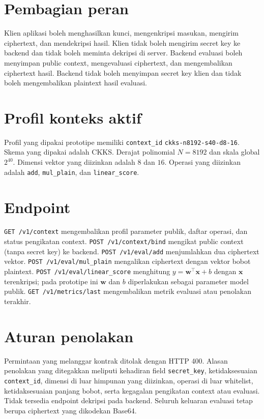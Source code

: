 \documentclass[12pt,a4paper,oneside]{report}
\begin{document}
\section*{Pembagian peran}

Klien aplikasi boleh menghasilkan kunci, mengenkripsi masukan, mengirim ciphertext, dan mendekripsi hasil. Klien tidak boleh mengirim secret key ke backend dan tidak boleh meminta dekripsi di server. Backend evaluasi boleh menyimpan public context, mengevaluasi ciphertext, dan mengembalikan ciphertext hasil. Backend tidak boleh menyimpan secret key klien dan tidak boleh mengembalikan plaintext hasil evaluasi.

\section*{Profil konteks aktif}

Profil yang dipakai prototipe memiliki \texttt{context\_id} \texttt{ckks-n8192-s40-d8-16}. Skema yang dipakai adalah CKKS. Derajat polinomial $N=8192$ dan skala global $2^{40}$. Dimensi vektor yang diizinkan adalah $8$ dan $16$. Operasi yang diizinkan adalah \texttt{add}, \texttt{mul\_plain}, dan \texttt{linear\_score}.

\section*{Endpoint}

\texttt{GET /v1/context} mengembalikan profil parameter publik, daftar operasi, dan status pengikatan context. \texttt{POST /v1/context/bind} mengikat public context (tanpa secret key) ke backend. \texttt{POST /v1/eval/add} menjumlahkan dua ciphertext vektor. \texttt{POST /v1/eval/mul\_plain} mengalikan ciphertext dengan vektor bobot plaintext. \texttt{POST /v1/eval/linear\_score} menghitung $y=\mathbf{w}^{\top}\mathbf{x}+b$ dengan $\mathbf{x}$ terenkripsi; pada prototipe ini $\mathbf{w}$ dan $b$ diperlakukan sebagai parameter model publik. \texttt{GET /v1/metrics/last} mengembalikan metrik evaluasi atau penolakan terakhir.

\section*{Aturan penolakan}

Permintaan yang melanggar kontrak ditolak dengan HTTP 400. Alasan penolakan yang ditegakkan meliputi kehadiran field \texttt{secret\_key}, ketidaksesuaian \texttt{context\_id}, dimensi di luar himpunan yang diizinkan, operasi di luar whitelist, ketidaksesuaian panjang bobot, serta kegagalan pengikatan context atau evaluasi. Tidak tersedia endpoint dekripsi pada backend. Seluruh keluaran evaluasi tetap berupa ciphertext yang dikodekan Base64.
\end{document}
